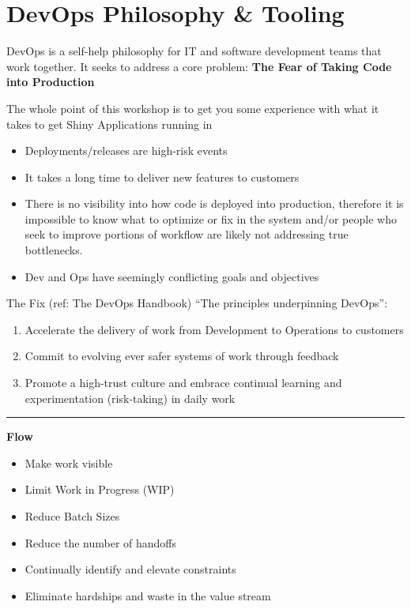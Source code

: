 \documentclass[]{book}
\providecommand{\tightlist}{%
  \setlength{\itemsep}{0pt}\setlength{\parskip}{0pt}}
\theoremstyle{definition}
\theoremstyle{definition}
\theoremstyle{definition}
\theoremstyle{remark}
\begin{document}
\hypertarget{devops-philosophy-tooling}{%
\chapter{DevOps Philosophy \& Tooling}\label{devops-philosophy-tooling}}

DevOps is a self-help philosophy for IT and software development teams
that work together. It seeks to address a core problem: \textbf{The Fear
of Taking Code into Production}

The whole point of this workshop is to get you some experience with what
it takes to get Shiny Applications running in

\begin{itemize}
\tightlist
\item
  Deployments/releases are high-risk events
\item
  It takes a long time to deliver new features to customers
\item
  There is no visibility into how code is deployed into production,
  therefore it is impossible to know what to optimize or fix in the
  system and/or people who seek to improve portions of workflow are
  likely not addressing true bottlenecks.
\item
  Dev and Ops have seemingly conflicting goals and objectives
\end{itemize}

The Fix (ref: The DevOps Handbook) ``The principles underpinning
DevOps'':

\begin{enumerate}
\def\labelenumi{\arabic{enumi}.}
\tightlist
\item
  Accelerate the delivery of work from Development to Operations to
  customers
\item
  Commit to evolving ever safer systems of work through feedback
\item
  Promote a high-trust culture and embrace continual learning and
  experimentation (risk-taking) in daily work
\end{enumerate}

\begin{center}\rule{0.5\linewidth}{\linethickness}\end{center}

\textbf{Flow}

\begin{itemize}
\tightlist
\item
  Make work visible
\item
  Limit Work in Progress (WIP)
\item
  Reduce Batch Sizes
\item
  Reduce the number of handoffs
\item
  Continually identify and elevate constraints
\item
  Eliminate hardships and waste in the value stream
\end{itemize}
\end{document}
